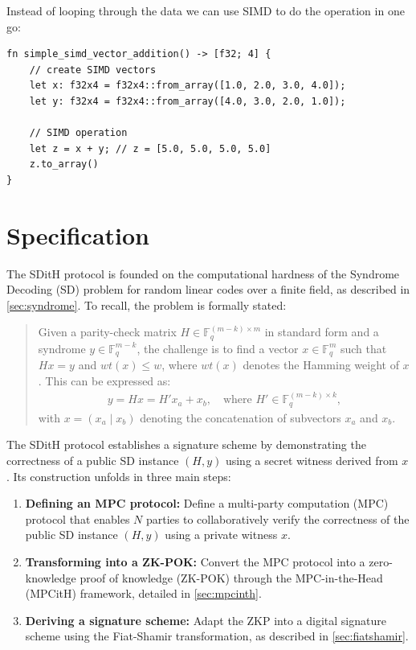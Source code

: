 \documentclass[11pt]{report}
\theoremstyle{definition}
\theoremstyle{plain}
\begin{document}
Instead of looping through the data we can use SIMD to do the operation in one go:

\begin{verbatim}
fn simple_simd_vector_addition() -> [f32; 4] {
    // create SIMD vectors
    let x: f32x4 = f32x4::from_array([1.0, 2.0, 3.0, 4.0]);
    let y: f32x4 = f32x4::from_array([4.0, 3.0, 2.0, 1.0]);

    // SIMD operation
    let z = x + y; // z = [5.0, 5.0, 5.0, 5.0]
    z.to_array() 
}
\end{verbatim}

\chapter{Specification}\label{ch:spec}

The SDitH protocol is founded on the computational hardness of the Syndrome Decoding (SD) problem for random linear codes over a finite field, as described in \autoref{sec:syndrome}. To recall, the problem is formally stated:
\begin{quote}
  Given a parity-check matrix $H \in \mathbb{F}_q^{(m-k) \times m}$ in standard form and a syndrome $y \in \mathbb{F}_q^{m-k}$, the challenge is to find a vector $x \in \mathbb{F}_q^m$ such that $Hx = y$ and $wt(x) \leq w$, where $wt(x)$ denotes the Hamming weight of $x$. This can be expressed as:
  \begin{align*}
    y = Hx = H'x_a + x_b, \quad \text{where } H' \in \mathbb{F}_q^{(m-k) \times k},
  \end{align*}
  with $x = (x_a \mid x_b)$ denoting the concatenation of subvectors $x_a$ and $x_b$.
\end{quote}

The SDitH protocol establishes a signature scheme by demonstrating the correctness of a public SD instance $(H, y)$ using a secret witness derived from $x$. Its construction unfolds in three main steps:
\begin{enumerate}
  \item \textbf{Defining an MPC protocol:} Define a multi-party computation (MPC) protocol that enables $N$ parties to collaboratively verify the correctness of the public SD instance $(H, y)$ using a private witness $x$.
  \item \textbf{Transforming into a ZK-POK:} Convert the MPC protocol into a zero-knowledge proof of knowledge (ZK-POK) through the MPC-in-the-Head (MPCitH) framework, detailed in \autoref{sec:mpcinth}.
  \item \textbf{Deriving a signature scheme:} Adapt the ZKP into a digital signature scheme using the Fiat-Shamir transformation, as described in \autoref{sec:fiatshamir}.
\end{enumerate}
\end{document}
